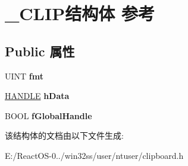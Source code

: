 \hypertarget{struct___c_l_i_p}{}\section{\+\_\+\+C\+L\+I\+P结构体 参考}
\label{struct___c_l_i_p}
\subsection*{Public 属性}
\begin{DoxyCompactItemize}
\item 
\mbox{\label{struct___c_l_i_p_ab012c5138ee571e7e06eb4818100943e}} 
U\+I\+NT {\bfseries fmt}
\item 
\mbox{\label{struct___c_l_i_p_a30d62e0097883ce0dc7b7a8de73bb9a8}} 
\hyperlink{interfacevoid}{H\+A\+N\+D\+LE} {\bfseries h\+Data}
\item 
\mbox{\label{struct___c_l_i_p_a33894e1c0397740ad2f966f9772ea80d}} 
B\+O\+OL {\bfseries f\+Global\+Handle}
\end{DoxyCompactItemize}


该结构体的文档由以下文件生成\+:\begin{DoxyCompactItemize}
\item 
E\+:/\+React\+O\+S-\/0../win32ss/user/ntuser/clipboard.\+h\end{DoxyCompactItemize}
